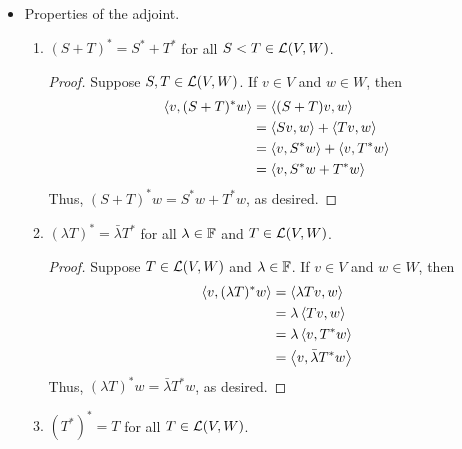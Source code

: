\documentclass[../main.tex]{subfiles}
\begin{document}
\begin{itemize}
\begin{theorem}
\begin{proof}
            Thus, by the definition of $T^*$,
            \begin{align*}
                T^*(w_1+w_2) &= T^*w_1+T^*w_2&
                T^*(\lambda w_1) &= \lambda T^*w
            \end{align*}
            so $T^*$ is a linear map, as desired.
        \end{proof}
    \end{theorem}
    \item Properties of the adjoint.
    \begin{theorem}\label{trm:adjointProperties}\leavevmode
        \begin{enumerate}[label={\textup{(}\alph*\textup{)}},ref={\thetheorem\alph*}]
            \item \label{trm:adjointPropertiesa}$(S+T)^*=S^*+T^*$ for all $S<T\in\mathcal{L}(V,W)$.
            \begin{proof}
                Suppose $S,T\in\mathcal{L}(V,W)$. If $v\in V$ and $w\in W$, then
                \begin{align*}
                    \left\langle{v},{(S+T)^*w}\right\rangle &= \left\langle{(S+T)v},{w}\right\rangle\\
                    &= \left\langle{Sv},{w}\right\rangle+\left\langle{Tv},{w}\right\rangle\\
                    &= \left\langle{v},{S^*w}\right\rangle+\left\langle{v},{T^*w}\right\rangle\\
                    &= \left\langle{v},{S^*w+T^*w}\right\rangle
                \end{align*}
                Thus, $(S+T)^*w=S^*w+T^*w$, as desired.
            \end{proof}
            \item \label{trm:adjointPropertiesb}$(\lambda T)^*=\bar{\lambda}T^*$ for all $\lambda\in\mathbb{F}$ and $T\in\mathcal{L}(V,W)$.
            \begin{proof}
                Suppose $T\in\mathcal{L}(V,W)$ and $\lambda\in\mathbb{F}$. If $v\in V$ and $w\in W$, then
                \begin{align*}
                    \left\langle{v},{(\lambda T)^*w}\right\rangle &= \left\langle{\lambda Tv},{w}\right\rangle\\
                    &= \lambda\left\langle{Tv},{w}\right\rangle\\
                    &= \lambda\left\langle{v},{T^*w}\right\rangle\\
                    &= \left\langle{v},{\bar{\lambda}T^*w}\right\rangle
                \end{align*}
                Thus, $(\lambda T)^*w=\bar{\lambda}T^*w$, as desired.
            \end{proof}
            \item \label{trm:adjointPropertiesc}$(T^*)^*=T$ for all $T\in\mathcal{L}(V,W)$.

\end{enumerate}
\end{theorem}
\end{itemize}
\end{document}
